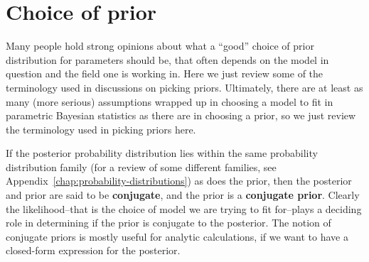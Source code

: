 \section{Choice of prior}
Many people hold strong opinions about what a ``good'' choice of
prior distribution for parameters should be, that often depends on the
model in question and the field one is working in.
Here we just review some of the terminology used in discussions on picking priors.
Ultimately, there are at least as many (more serious) assumptions wrapped up in choosing a model
to fit in parametric Bayesian statistics as there are in choosing a prior, 
so we just review the terminology used in picking priors here.

If the posterior probability distribution lies within the same probability
distribution family (for a review of some different families, see Appendix~\ref{chap:probability-distributions}) 
as does the prior, then the posterior and prior are said to be
\textbf{conjugate}, and the prior is a \textbf{conjugate prior}.
Clearly the likelihood--that is the choice of model we are trying to fit for--plays 
a deciding role in determining if the prior is conjugate to the posterior.
The notion of conjugate priors is mostly useful for analytic calculations,
if we want to have a closed-form expression for the posterior.

